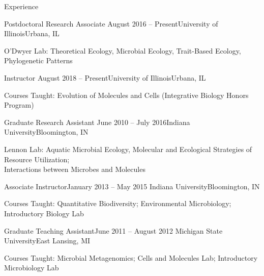\documentclass{resume} %
\begin{document}
\begin{rSection}{Experience}

    \begin{rSubsection}{Postdoctoral Research Associate}
      {August 2016 -- Present}{University of Illinois}{Urbana, IL}
      \item O'Dwyer Lab: Theoretical Ecology, Microbial Ecology, Trait-Based Ecology, Phylogenetic Patterns
    \end{rSubsection}

    \begin{rSubsection}{Instructor}
      {August 2018 -- Present}{University of Illinois}{Urbana, IL}
      \item Courses Taught: Evolution of Molecules and Cells (Integrative Biology Honors Program)
    \end{rSubsection}

  \begin{rSubsection}{Graduate Research Assistant}
    {June 2010 -- July 2016}{Indiana University}{Bloomington, IN}
    \item Lennon Lab: Aquatic Microbial Ecology, Molecular and Ecological Strategies of Resource Utilization; \\
                      Interactions between Microbes and Molecules
  \end{rSubsection}

  \begin{rSubsection}{Associate Instructor}{January 2013 -- May 2015}
    {Indiana University}{Bloomington, IN}
    \item Courses Taught: Quantitative Biodiversity; Environmental Microbiology;
                          Introductory Biology Lab
  \end{rSubsection}

  \begin{rSubsection}{Graduate Teaching Assistant}{June 2011 -- August 2012}
    {Michigan State University}{East Lansing, MI}
    \item Courses Taught: Microbial Metagenomics; Cells and Molecules Lab;
                          Introductory Microbiology Lab
  \end{rSubsection}


\end{rSection}
\end{document}
